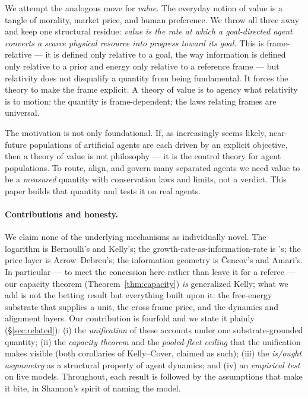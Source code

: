 \documentclass[11pt]{article}
\theoremstyle{plain}
\theoremstyle{definition}
\theoremstyle{remark}
\begin{document}
We attempt the analogous move for \emph{value}. The everyday notion of value is a tangle of morality, market
price, and human preference. We throw all three away and keep one structural residue: \emph{value is the rate at
which a goal-directed agent converts a scarce physical resource into progress toward its goal.} This is
frame-relative --- it is defined only relative to a goal, the way information is defined only relative to a prior
and energy only relative to a reference frame --- but relativity does not disqualify a quantity from being
fundamental. It forces the theory to make the frame explicit. A theory of value is to agency what relativity is
to motion: the quantity is frame-dependent; the laws relating frames are universal.

The motivation is not only foundational. If, as increasingly seems likely, near-future populations of
artificial agents are each driven by an explicit objective, then a theory of value is not philosophy --- it is
the control theory for agent populations. To route, align, and govern many separated agents we need value to be
a \emph{measured} quantity with conservation laws and limits, not a verdict. This paper builds that quantity and
tests it on real agents.

\paragraph{Contributions and honesty.} We claim none of the underlying mechanisms as individually novel. The
logarithm is Bernoulli's and Kelly's; the growth-rate-as-information-rate is \citeauthor{kelly1956}'s; the
price layer is Arrow--Debreu's; the information geometry is \v{C}encov's and Amari's. In particular --- to meet
the concession here rather than leave it for a referee --- our capacity theorem (Theorem~\ref{thm:capacity}) \emph{is}
generalized Kelly; what we add is not the betting result but everything built upon it: the free-energy substrate
that supplies a unit, the cross-frame price, and the dynamics and alignment layers. Our contribution is
fourfold and we state it plainly (\S\ref{sec:related}): (i) the \emph{unification} of these accounts under one
substrate-grounded quantity; (ii) the \emph{capacity theorem} and the \emph{pooled-fleet ceiling} that the
unification makes visible (both corollaries of Kelly--Cover, claimed as such); (iii) the \emph{is/ought
asymmetry} as a structural property of agent dynamics; and (iv) an \emph{empirical test} on live models. Throughout, each result is followed by the assumptions that make it bite,
in Shannon's spirit of naming the model.
\end{document}
